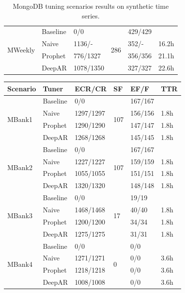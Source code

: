 \documentclass[a4paper, 12pt]{article} %
\newcommand{\ra}[1]{\renewcommand{\arraystretch}{#1}}
\begin{document}
\begin{table}
\begin{tabularx}{\textwidth}{@{}XXXXXX@{}}
			\midrule
			\multirow{4}{*}{MWeekly}
			& Baseline & 0/0 & \multirow{4}{*}{286} & 429/429 & \\
			& Naive & 1136/- && 352/- & 16.2h \\
			& Prophet & 776/1327 && 356/356 & 21.1h\\
			& DeepAR & 1078/1350 && 327/327 & 22.6h\\
			
			\bottomrule
		\end{tabularx}
		\caption{MongoDB tuning scenarios results on synthetic time series. } \label{table:results_mongo_synthetic}
	\end{table}

	\begin{table}\centering 
		\ra{1.3}
		\begin{tabularx}{\textwidth}{@{}XXXXXX@{}}
			\toprule
			Scenario & Tuner & ECR/CR & SF & EF/F & TTR\\

			\midrule
			\multirow{4}{*}{MBank1}
			& Baseline & 0/0 & \multirow{4}{*}{107} & 167/167 & \\
			& Naive & 1297/1297 && 156/156 & 1.8h \\
			& Prophet & 1290/1290 && 147/147 & 1.8h\\
			& DeepAR & 1268/1268 && 145/145 & 1.8h\\
			
			\midrule
			\multirow{4}{*}{MBank2}
			& Baseline & 0/0 & \multirow{4}{*}{107} & 167/167 & \\
			& Naive & 1227/1227 && 159/159 & 1.8h \\
			& Prophet & 1055/1055 && 151/151 & 1.8h\\
			& DeepAR & 1320/1320 && 148/148 & 1.8h\\
			
			\midrule
			\multirow{4}{*}{MBank3}
			& Baseline & 0/0 & \multirow{4}{*}{17} & 19/19 & \\
			& Naive & 1468/1468 && 40/40 & 1.8h \\
			& Prophet & 1200/1200 && 34/34 & 1.8h\\
			& DeepAR & 1275/1275 && 31/31 & 1.8h\\
			
			\midrule
			\multirow{4}{*}{MBank4}
			& Baseline & 0/0 & \multirow{4}{*}{0} & 0/0 & \\
			& Naive & 1271/1271 && 0/0 & 3.6h \\
			& Prophet & 1218/1218 && 0/0 & 3.6h\\
			& DeepAR & 1008/1008 && 0/0 & 3.6h\\
			

\end{tabularx}
\end{table}
\end{document}
